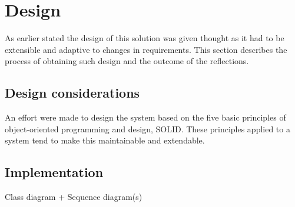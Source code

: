 \section{Design}
As earlier stated the design of this solution was given thought as it had to be extensible and adaptive to changes in requirements. This section describes the process of obtaining such design and the outcome of the reflections.

\subsection{Design considerations}
An effort were made to design the system based on the five basic principles of object-oriented programming and design, SOLID. These principles applied to a system tend to make this maintainable and extendable.

\subsection{Implementation}

Class diagram + Sequence diagram(s)

\clearpage
